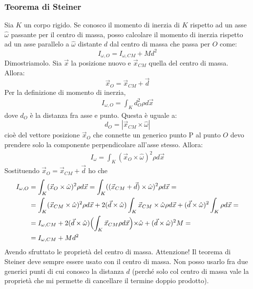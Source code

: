\documentclass[a4paper,openany]{article}
\begin{document}
	\subsubsection{Teorema di Steiner}
	Sia $K$ un corpo rigido. Se conosco il momento di inerzia di $K$ rispetto ad un asse $\hat{\omega}$ passante per il centro di massa, posso calcolare il momento di inerzia rispetto ad un asse parallelo a $\hat{\omega}$ distante $d$ dal centro di massa che passa per $O$ come:
	$$
	I_{\omega,O} = I_{\omega, CM} + Md^{2}
	$$
	Dimostriamolo. Sia $\vec{x}$ la posizione nuovo e $\vec{x}_{CM}$ quella del centro di massa.
	Allora:
	$$
	\vec{x}_O = \vec{x}_{CM}+\vec{d}
	$$
	Per la definizione di momento di inerzia,
	\begin{equation}\label{key}
		\begin{aligned}
			I_{\omega,O} = \int_{K}d^2_O \rho d\vec{x}
		\end{aligned}
	\end{equation}
    dove $d_O$ è la distanza fra asse e punto. Questa è uguale a:
    $$
    d_O = |\vec{x}_{CM}\times\hat{\omega}|
    $$
    cioè del vettore posizione $\vec{x}_O$ che connette un generico punto P al punto $O$ devo prendere solo la componente perpendicolare all'asse stesso. Allora:
    \begin{equation}\label{key}
    	\begin{aligned}
    		I_{\omega} = \int_{K}(\vec{x}_{O}\times\hat{\omega})^2 \rho d\vec{x}
    	\end{aligned}
    \end{equation}
Sostituendo $\vec{x}_O = \vec{x}_{CM}+\vec{d}$ ho che
    \begin{equation}\label{key}
	\begin{aligned}
		I_{\omega,O} &= \int_{K}(\vec{x}_{O}\times\hat{\omega})^2 \rho d\vec{x} = \int_{K}((\vec{x}_{CM}+\vec{d})\times\hat{\omega})^2 \rho d\vec{x} =  \\
		&= \int_{K}(\vec{x}_{CM}\times\hat\omega)^2\rho d\vec{x} + 2(\vec{d}\times\hat\omega)\int_{K}\vec{x}_{CM}\times\hat\omega\rho d\vec{x} +(\vec{d}\times\hat\omega)^2 \int_{K}\rho d\vec{x} = \\
		&= I_{\omega, CM} + 2(\vec{d}\times\hat\omega)\Bigl(\int_{K}\vec{x}_{CM}\rho d\vec{x}\Bigl) \times \hat\omega+ (\vec{d}\times\hat\omega)^2 M = \\
		&= I_{\omega, CM} + Md^2
	\end{aligned}
\end{equation}
Avendo sfruttato le proprietà del centro di massa. Attenzione! Il teorema di Steiner deve sempre essere usato con il centro di massa. Non posso usarlo fra due generici punti di cui conosco la distanza $d$ (perché solo col centro di massa vale la proprietà che mi permette di cancellare il termine doppio prodotto).
\end{document}
